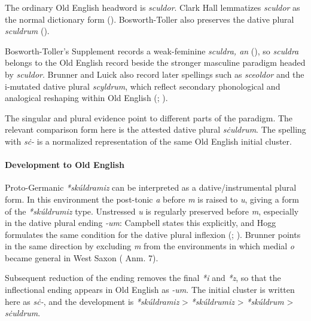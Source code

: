 \documentclass[
  british,
  a4paper,
]{article}
\begin{document}
The ordinary Old English headword is \emph{sculdor}. Clark Hall
lemmatizes \emph{sculdor} as the normal dictionary form
(). Bosworth-Toller
also preserves the dative plural \emph{sculdrum}
().

Bosworth-Toller's Supplement records a weak-feminine \emph{sculdra, an}
(), so
\emph{sculdra} belongs to the Old English record beside the stronger
masculine paradigm headed by \emph{sculdor}. Brunner and Luick also
record later spellings such as \emph{sceoldor} and the i-mutated dative
plural \emph{scyldrum}, which reflect secondary phonological and
analogical reshaping within Old English
(;
).

The singular and plural evidence point to different parts of the
paradigm. The relevant comparison form here is the attested dative
plural \emph{sċuldrum}. The spelling with \emph{sċ-} is a normalized
representation of the same Old English initial cluster.

\paragraph{Development to Old
English}\label{development-to-old-english-53}

Proto-Germanic \emph{*skúldramiz} can be interpreted as a
dative/instrumental plural form. In this environment the post-tonic
\emph{a} before \emph{m} is raised to \emph{u}, giving a form of the
\emph{*skúldrumiz} type. Unstressed \emph{u} is regularly preserved
before \emph{m}, especially in the dative plural ending \emph{-um}:
Campbell states this explicitly, and Hogg formulates the same condition
for the dative plural inflexion (; ).
Brunner points in the same direction by excluding \emph{m} from the
environments in which medial \emph{o} became general in West Saxon
( Anm. 7).

Subsequent reduction of the ending removes the final \emph{*i} and
\emph{*z}, so that the inflectional ending appears in Old English as
\emph{-um}. The initial cluster is written here as \emph{sċ-}, and the
development is \emph{*skúldramiz} \textgreater{} \emph{*skúldrumiz}
\textgreater{} \emph{*skúldrum} \textgreater{} \emph{sċuldrum}.
\end{document}
